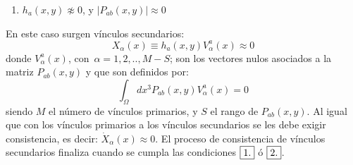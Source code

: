 \documentclass[a4paper,12pt]{article}
\begin{document}
\begin{enumerate}
 \item [\fbox{3.}] $h_a(x,y)\not\approx0$, y $|P_{ab}(x,y)|\approx0$ 
\end{enumerate}
En este caso surgen vínculos secundarios:
\begin{equation}
X_\alpha(x)\equiv h_a(x,y)V^a_\alpha(x)\approx0
\end{equation}
donde $V^a_\alpha(x)$, \mbox{con $\alpha=1,2,..,M-S$;} son los vectores nulos asociados a la matriz \mbox{$P_{ab}(x,y)$} y que son definidos por:
\begin{equation}
\int_\Omega dx^3P_{ab}(x,y)V^a_\alpha(x)=0 
\end{equation}
siendo \mbox{$M$} el número de vínculos primarios, y $S$ el rango de $P_{ab}(x,y)$. Al igual que con los vínculos primarios a los vínculos secundarios se les debe exigir consistencia, es decir: \mbox{$\dot{X}_\alpha(x)\approx0$}. El proceso de consistencia de vínculos secundarios finaliza cuando se cumpla las condiciones $\fbox{1.}$ ó $\fbox{2.}$.
\\
\end{document}
